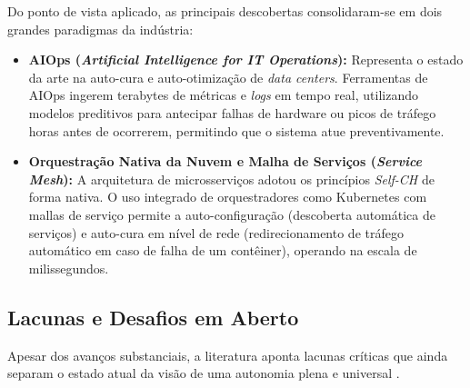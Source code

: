Do ponto de vista aplicado, as principais descobertas consolidaram-se em dois grandes paradigmas da indústria:
\begin{itemize}
	\item \textbf{AIOps (\textit{Artificial Intelligence for IT Operations}):} Representa o estado da arte na auto-cura e auto-otimização de \textit{data centers}. Ferramentas de AIOps ingerem terabytes de métricas e \textit{logs} em tempo real, utilizando modelos preditivos para antecipar falhas de hardware ou picos de tráfego horas antes de ocorrerem, permitindo que o sistema atue preventivamente.
	\item \textbf{Orquestração Nativa da Nuvem e Malha de Serviços (\textit{Service Mesh}):} A arquitetura de microsserviços adotou os princípios \textit{Self-CH} de forma nativa. O uso integrado de orquestradores como Kubernetes com mallas de serviço permite a auto-configuração (descoberta automática de serviços) e auto-cura em nível de rede (redirecionamento de tráfego automático em caso de falha de um contêiner), operando na escala de milissegundos.
\end{itemize}

\subsection{Lacunas e Desafios em Aberto}

Apesar dos avanços substanciais, a literatura aponta lacunas críticas que ainda separam o estado atual da visão de uma autonomia plena e universal \cite{kephart2003, sterritt2005}.

